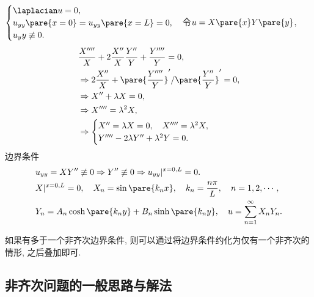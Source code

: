 \documentclass[hidelinks]{ctexart}
\begin{document}
\begin{sample}
    \begin{ex}
        $\displaystyle \begin{cases}
            \laplacian u = 0, \\
            u_{yy}\pare{x=0} = u_{yy}\pare{x=L} = 0, \\
            u_yy\not\equiv 0.
        \end{cases}$令$u = X\pare{x}Y\pare{y}$,
        \begin{align*}
            &\frac{X''''}{X} + 2\frac{X''}{X}\frac{Y''}{Y} + \frac{Y''''}{Y} = 0, \\
            &\Rightarrow 2\frac{X''}{X} + \pare{\frac{Y''''}{Y}}'/\pare{\frac{Y''}{Y}}' = 0,\\
            &\Rightarrow X'' + \lambda X = 0, \\
            &\Rightarrow X'''' = \lambda^2 X, \\
            &\Rightarrow \begin{cases}
                X'' = \lambda X = 0,\quad X'''' = \lambda^2 X, \\
                Y'''' - 2\lambda Y'' + \lambda^2 Y = 0.
            \end{cases}
        \end{align*}
        边界条件
        \begin{align*}
            & u_{yy} = XY'' \not\equiv 0 \Rightarrow Y'' \not\equiv 0 \Rightarrow u_{yy}\vert^{x=0,L} = 0. \\
            & X\vert^{x=0,L} = 0,\quad X_n = \sin\pare{k_n x},\quad k_n = \frac{n\pi}{L},\quad n = 1,2,\cdots, \\
            & Y_n = A_n\cosh\pare{k_n y} + B_n\sinh\pare{k_n y},\quad u = \sum_{n=1}^{\infty} X_nY_n.
        \end{align*}
    \end{ex}
\end{sample}
如果有多于一个非齐次边界条件, 则可以通过将边界条件约化为仅有一个非齐次的情形, 之后叠加即可.


\subsection{非齐次问题的一般思路与解法} %
\label{sub:非齐次问题的一般思路与解法}
\end{document}
